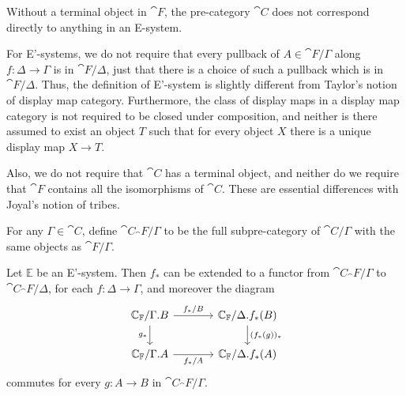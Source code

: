 \begin{rmk}
Without a terminal object in $\cat{F}$, the pre-category $\cat{C}$ does not correspond
directly to anything in an E-system.
\end{rmk}

\begin{rmk}
For E'-systems, we do not require that every pullback of $A\in\cat{F}/\Gamma$ along $f:\Delta\to\Gamma$
is in $\cat{F}/\Delta$, just that there is a choice of such a pullback which is
in $\cat{F}/\Delta$. Thus, the definition of E'-system is slightly different from
Taylor's notion of display map category. Furthermore, the class of display maps in
a display map category is not required to be closed under composition, and neither
is there assumed to exist an object $T$ such that for every object $X$ there is a 
unique display map $X\to T$.
\end{rmk}

\begin{rmk}
Also, we do not require that $\cat{C}$ has a terminal object, and neither do
we require that $\cat{F}$ contains all the isomorphisms of $\cat{C}$. These are
essential differences with Joyal's notion of tribes.   
\end{rmk}

\begin{defn}
For any $\Gamma\in\cat{C}$, define $\cat{C}_\cat{F}/\Gamma$ to be the full
subpre-category of $\cat{C}/\Gamma$ with the same objects as $\cat{F}/\Gamma$. 
\end{defn}

\begin{lem}\label{lem:pb_selfdistributive}
Let $\mathbb{E}$ be an E'-system. Then $f_\ast$ can be extended to a functor from
$\cat{C}_\cat{F}/\Gamma$ to $\cat{C}_\cat{F}/\Delta$, for each $f:\Delta\to\Gamma$, and moreover the diagram
\begin{equation*}
\begin{tikzcd}[column sep=large]
\cat{C}_\cat{F}/\ctxext{\Gamma}{B} \arrow[r,"{f_\ast/B}"] \arrow[d,swap,"{g_\ast}"]
& \cat{C}_\cat{F}/\ctxext{\Delta}{f_\ast(B)} \arrow[d,"{(f_\ast(g))_\ast}"] \\
\cat{C}_\cat{F}/\ctxext{\Gamma}{A} \arrow[r,swap,"{f_\ast/A}"]
& \cat{C}_\cat{F}/\ctxext{\Delta}{f_\ast(A)}
\end{tikzcd}
\end{equation*}
commutes for every $g:A\to B$ in $\cat{C}_\cat{F}/\Gamma$.
\end{lem}

